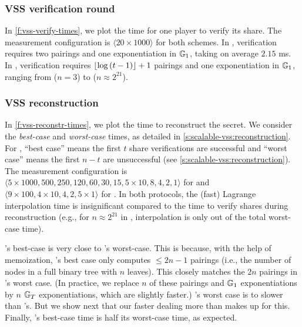 \subsubsection{VSS verification round}
\label{s:eval:vss:share-verif}
In \cref{f:vss-verify-times}, we plot the time for one player to verify its share.
The measurement configuration is $\langle 20 \times 1000\rangle$ for both schemes.
In \evss, verification requires two pairings and one exponentiation in $\mathbb{G}_1$, taking on average $2.15$ ms.
In \ourvss, verification requires $\lfloor\log{(t-1)}\rfloor + 1$ pairings and one exponentiation in $\mathbb{G}_1$, ranging from  ($n=3$) to  ($n\approx 2^{21}$).

\subsubsection{VSS reconstruction}
\label{s:eval:vss:reconstr}
In \cref{f:vss-reconstr-times}, we plot the time to reconstruct the secret.
We consider the \textit{best-case} and \textit{worst-case} times, as detailed in \cref{s:scalable-vss:reconstruction}.
For \evss, ``best case'' means the first $t$ share verifications are successful and ``worst case'' means the first $n-t$ are unsuccessful (see \cref{s:scalable-vss:reconstruction}).
The measurement configuration is $\langle 5 \times 1000, 500, 250, 120, 60, 30, 15, 5\times 10, 8,4,2,1\rangle$ for \evss and $\langle 9 \times 100, 4\times 10, 4,2, 5\times 1\rangle$ for \ourvss.
In both protocols, the (fast) Lagrange interpolation time is insignificant compared to the time to verify shares during reconstruction (e.g., for $n\approx 2^{21}$ in \evss, interpolation is only  out of the total  worst-case time).

\ourvss's best-case is very close to \evss's worst-case.
This is because, with the help of memoization, \ourvss's best case only computes $\le 2n-1$ pairings (i.e., the number of nodes in a full binary tree with $n$ leaves).
This closely matches the $2n$ pairings in \evss's worst case.
(In practice, we replace $n$ of these pairings and $\mathbb{G}_1$ exponentiations by $n$ $\mathbb{G}_T$ exponentiations, which are slightly faster.)
\ourvss's worst case is  to  slower than \evss's.
But we show next that our faster dealing more than makes up for this.
Finally, \evss's best-case time is half its worst-case time, as expected.

